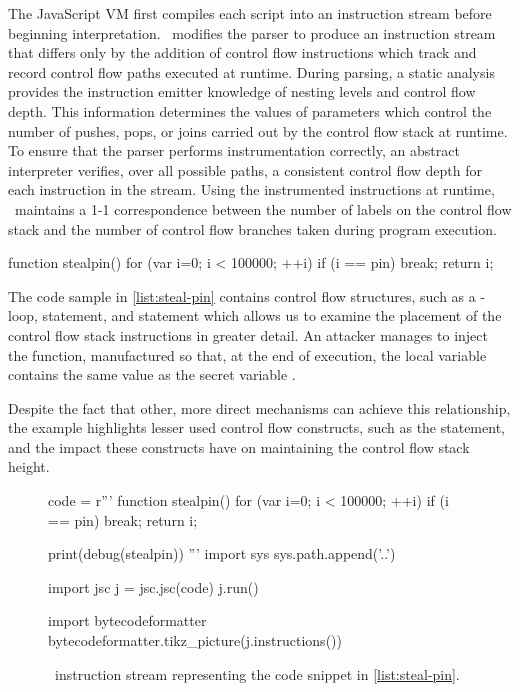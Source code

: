 The JavaScript VM first compiles each script into an instruction stream before beginning interpretation.
\JitFlow\ modifies the parser to produce an instruction stream that differs only by the addition of control flow instructions which track and record control flow paths executed at runtime.
During parsing, a static analysis provides the instruction emitter knowledge of nesting levels and control flow depth.
This information determines the values of parameters which control the number of pushes, pops, or joins carried out by the control flow stack at runtime.
To ensure that the parser performs instrumentation correctly, an abstract interpreter verifies, over all possible paths, a consistent control flow depth for each instruction in the stream.
Using the instrumented instructions at runtime, \JitFlow\ maintains a 1-1 correspondence between the number of labels on the control flow stack and the number of control flow branches taken during program execution.

\begin{jscode}
function stealpin() {
  for (var i=0; i < 100000; ++i) {
    if (i == pin) break;
  }
  return i;
}
\end{jscode}

The code sample in \autoref{list:steal-pin} contains control flow structures, such as a -loop,  statement, and  statement which allows us to examine the placement of the control flow stack instructions in greater detail.
An attacker manages to inject the  function, manufactured so that, at the end of execution, the local variable  contains the same value as the secret variable .

Despite the fact that other, more direct mechanisms can achieve this relationship, the example highlights lesser used control flow constructs, such as the  statement, and the impact these constructs have on maintaining the control flow stack height.

\begin{figure}[h]
\begin{python}
code = r'''
function stealpin() {
  for (var i=0; i < 100000; ++i) {
    if (i == pin) break;
  }
  return i;
}

print(debug(stealpin))
'''
import sys
sys.path.append('..')

import jsc
j = jsc.jsc(code)
j.run()

import bytecodeformatter
bytecodeformatter.tikz_picture(j.instructions())
\end{python}
  \caption{\JitFlow\ instruction stream representing the code snippet in \autoref{list:steal-pin}.}
  \label{fig:steal-pin-bytecode}
\end{figure}

